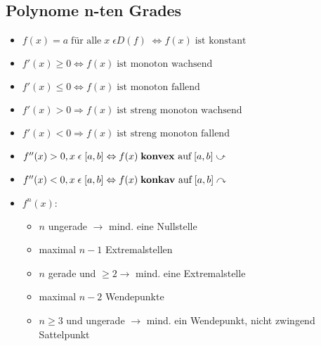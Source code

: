 \subsection{Polynome n-ten Grades}
    \vspace*{0.5em}
    \begin{itemize}
        \item $f(x) = a \; \text{für alle} \; x \; \epsilon D(f) \; \Leftrightarrow f(x) \; \text{ist konstant}$
        \item $f'(x) \geq 0 \Leftrightarrow f(x) \; \text{ist monoton wachsend}$
        \item $f'(x) \leq 0 \Leftrightarrow f(x) \; \text{ist monoton fallend}$
        \item $f'(x) > 0 \Rightarrow f(x) \; \text{ist streng monoton wachsend}$
        \item $f'(x) < 0 \Rightarrow f(x) \; \text{ist streng monoton fallend}$
        \item $f''(x) > 0, x \; \epsilon \; [a,b] \Leftrightarrow f(x) \; \text{\textbf{konvex} auf} \; [a,b] \; \rotatebox[origin=c]{180}{$\curvearrowleft$}$
        \item $f''(x) < 0, x \; \epsilon \; [a,b] \Leftrightarrow f(x) \; \text{\textbf{konkav} auf} \; [a,b] \curvearrowright$
        \item $f^n(x):$
            \vspace*{-0.5em}
            \begin{itemize}
                \item $n$ ungerade $\rightarrow$ mind. eine Nullstelle
                \item maximal $n-1$ Extremalstellen
                \item $n$ gerade und $\geq 2 \rightarrow $ mind. eine Extremalstelle
                \item maximal $n-2$ Wendepunkte
                \item $n \geq 3$ und ungerade $\rightarrow$ mind. ein Wendepunkt, nicht zwingend Sattelpunkt
            \end{itemize}
    \end{itemize}